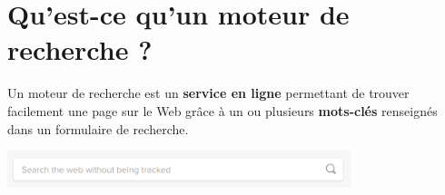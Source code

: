 \documentclass[a4paper, dvipsnames]{article}
\begin{document}
\section{Qu'est-ce qu'un moteur de recherche ?}
Un moteur de recherche est un \textbf{service en ligne} permettant de trouver facilement une page sur le Web grâce à un ou plusieurs \textbf{mots-clés} renseignés dans un formulaire de recherche.

\begin{center}
  \includegraphics[width=10cm]{ch_1_formulaire_moteur_de_recherche.png}
\end{center}

\medskip
\end{document}
